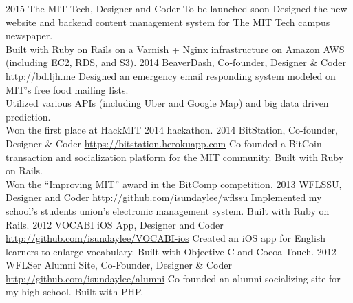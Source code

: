\documentclass[print]{friggeri-cv} %
\begin{document}
\begin{entrylist}
  \entry
  {2015}
  {The MIT Tech, Designer and Coder}
  {To be launched soon}
  {Designed the new website and backend content management system for The MIT Tech campus newspaper. \\
  Built with Ruby on Rails on a Varnish + Nginx infrastructure on Amazon AWS (including EC2, RDS, and S3). }
  \entry
  {2014}
  {BeaverDash, Co-founder, Designer \& Coder}
  {\href{http://bd.ljh.me}{http://bd.ljh.me}}
  {Designed an emergency email responding system modeled on MIT's free food mailing lists. \\
  Utilized various APIs (including Uber and Google Map) and big data driven prediction. \\
  Won the first place at HackMIT 2014 hackathon. }
  \entry
  {2014}
  {BitStation, Co-founder, Designer \& Coder}
  {\href{https://bitstation.herokuapp.com}{https://bitstation.herokuapp.com}}
  {Co-founded a BitCoin transaction and socialization platform for the MIT community. Built with Ruby on Rails. \\
  Won the ``Improving MIT'' award in the BitComp competition. }
  \entry
  {2013}
  {WFLSSU, Designer and Coder}
  {\href{http://github.com/isundaylee/wflssu}{http://github.com/isundaylee/wflssu}}
  {Implemented my school's students union's electronic management system. Built with Ruby on Rails.}
  \entry
  {2012}
  {VOCABI iOS App, Designer and Coder}
  {\href{http://github.com/isundaylee/VOCABI-ios}{http://github.com/isundaylee/VOCABI-ios}}
  {Created an iOS app for English learners to enlarge vocabulary. Built with Objective-C and Cocoa Touch.}
  \entry
  {2012}
  {WFLSer Alumni Site, Co-Founder, Designer \& Coder}
  {\href{http://github.com/isundaylee/alumni}{http://github.com/isundaylee/alumni}}
  {Co-founded an alumni socializing site for my high school. Built with PHP. }
\end{entrylist}


\end{document}
